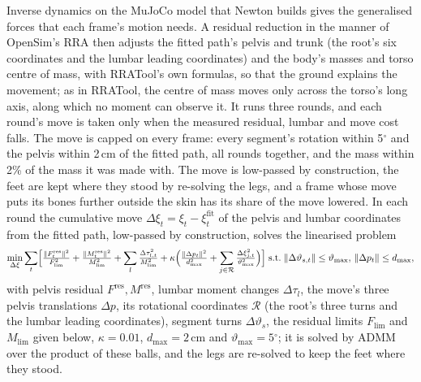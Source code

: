 \documentclass[11pt]{article}
\makeatletter
\newcommand{\dg}{\ensuremath{^\circ}}
\renewcommand\paragraph{\@startsection{paragraph}{4}{\z@}{1.6ex \@plus .5ex \@minus .2ex}{-1em}{\normalfont\normalsize\bfseries}}
\makeatother
\begin{document}
\paragraph{Residual reduction.} Inverse dynamics on the MuJoCo model that Newton builds gives the generalised forces
that each frame's motion needs. A residual reduction in the manner of OpenSim's RRA \cite{delp2007opensim} then adjusts
the fitted path's pelvis and trunk (the root's six coordinates and the lumbar leading coordinates) and the body's
masses and torso centre of mass, with RRATool's own formulas, so that the ground explains the movement; as in
RRATool, the centre of mass moves only across the torso's long axis, along which no moment can observe it. It runs three
rounds, and each round's move is taken only when the measured residual, lumbar and move cost falls. The move is
capped on every frame: every segment's rotation within 5\dg{} and the pelvis within 2\,cm of the fitted path, all
rounds together, and the mass within 2\% of the mass it was made with. The move is low-passed by construction, the
feet are kept where they stood by re-solving the legs, and a frame whose move puts its bones further outside the skin
has its share of the move lowered.
In each round the cumulative move $\Delta\xi_t=\xi_t-\xi^{\mathrm{fit}}_t$ of the pelvis and lumbar coordinates
from the fitted path, low-passed by construction, solves the linearised problem
\begin{equation}
\min_{\Delta\xi}\sum_t\Bigl[\tfrac{\lVert F^{\mathrm{res}}_t\rVert^2}{F_{\lim}^2}+\tfrac{\lVert M^{\mathrm{res}}_t\rVert^2}{M_{\lim}^2}
+\sum_{l}\tfrac{\Delta\tau_{l,t}^2}{M_{\lim}^2}+\kappa\Bigl(\tfrac{\lVert\Delta p_t\rVert^2}{d_{\max}^2}
+\sum_{j\in\mathcal{R}}\tfrac{\Delta\xi_{j,t}^2}{\vartheta_{\max}^2}\Bigr)\Bigr]
\;\text{s.t.}\;\lVert\Delta\vartheta_{s,t}\rVert\le\vartheta_{\max},\,\lVert\Delta p_t\rVert\le d_{\max},
\label{eq:rra}
\end{equation}
with pelvis residual $F^{\mathrm{res}},M^{\mathrm{res}}$, lumbar moment changes $\Delta\tau_l$, the move's three
pelvis translations $\Delta p$, its rotational coordinates $\mathcal{R}$ (the root's three turns and the lumbar leading
coordinates), segment turns $\Delta\vartheta_s$, the residual limits $F_{\lim}$ and $M_{\lim}$ given below,
$\kappa=0.01$, $d_{\max}=2$\,cm and $\vartheta_{\max}=5\dg$; it is solved by ADMM over the product of these balls, and
the legs are re-solved to keep the feet where they stood.
\end{document}
